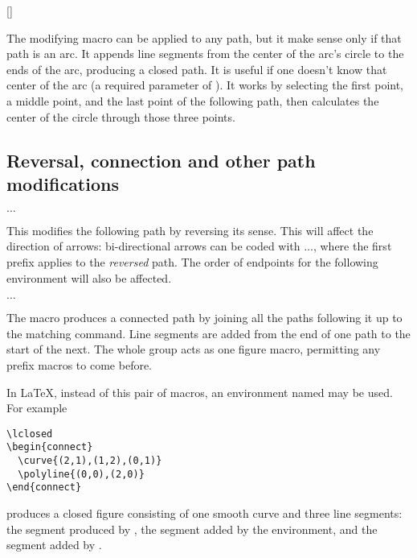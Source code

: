 \documentclass[letterpaper]{article}
\begin{document}
\begin{cd}
[]%
\end{cd}

The modifying macro  can be applied to any path, but it
make sense only if that path is an arc. It appends line segments from
the center of the arc's circle to the ends of the arc, producing a
closed path. It is useful if one doesn't know that center of the arc (a
required parameter of ). It works by selecting the first
point, a middle point, and the last point of the following path, then
calculates the center of the circle through those three points.


\subsection{Reversal, connection and other path modifications}%
\label{reversal}

\begin{cd}
$\ldots$%
\end{cd}

This modifies the following path by reversing its sense. This will
affect the direction of arrows: bi-directional arrows can be coded with
$\ldots$, where the first 
prefix applies to the \emph{reversed} path. The order of endpoints for
the following  environment will also be affected.


\begin{cd}
 $\ldots$ %
%
\end{cd}

The macro  produces a connected path by joining all the
paths following it up to the matching  command. Line
segments are added from the end of one path to the start of the next.
The whole group acts as one figure macro, permitting any prefix macros
to come before.

In \LaTeX{}, instead of this pair of macros, an environment named
 may be used. For example
\begin{verbatim}
\lclosed
\begin{connect}
  \curve{(2,1),(1,2),(0,1)}
  \polyline{(0,0),(2,0)}
\end{connect}
\end{verbatim}
produces a closed figure consisting of one smooth curve and three line
segments: the segment produced by , the segment added by
the  environment, and the segment added by .
\end{document}

